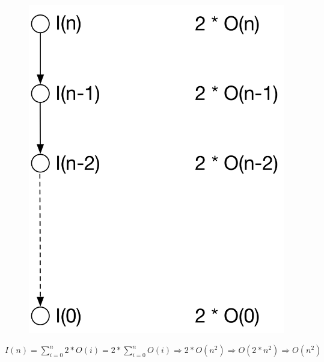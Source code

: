 \begin{figure}[H]
    \centering
    \includegraphics[scale=0.5]{1a)}
\end{figure}

$I(n) = \sum_{i=0}^{n} 2 * O(i) = 2 * \sum_{i=0}^{n} O(i) \Rightarrow  2 * O(n^2) \Rightarrow  O(2 * n^2) \Rightarrow O(n^2)$


